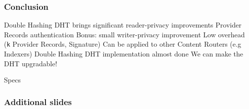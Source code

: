 \documentclass{pl-slide}
\begin{document}
\begin{frame}
\frametitle{Conclusion}
\begin{minipage}{.8\linewidth}
\begin{itemize}
	\itemc Double Hashing DHT brings significant reader-privacy improvements
	\itemc Provider Records authentication
	\itemc Bonus: small writer-privacy improvement
	\itemc Low overhead (\texttt{k} Provider Records, Signature)
	\itemc Can be applied to other Content Routers (e.g Indexers)
	\itemc Double Hashing DHT implementation almost done
	\itemc We can make the DHT upgradable!
\end{itemize}

\end{minipage}
\begin{minipage}{.19\linewidth}
\begin{center}
Specs
\end{center}
\end{minipage}

\end{frame}

\begin{frame}
\frametitle{Additional slides}
\end{frame}
\end{document}
